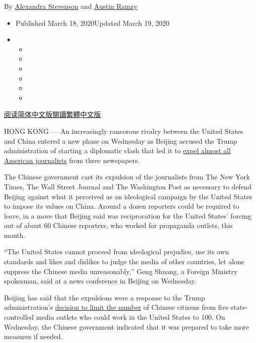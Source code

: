 By \href{https://www.nytimes.com/by/alexandra-stevenson}{Alexandra
Stevenson} and \href{https://www.nytimes.com/by/austin-ramzy}{Austin
Ramzy}

\begin{itemize}
\item
  Published March 18, 2020Updated March 19, 2020
\item
  \begin{itemize}
  \item
  \item
  \item
  \item
  \item
  \item
  \end{itemize}
\end{itemize}

\href{https://cn.nytimes.com/china/20200319/china-expels-journalists/}{阅读简体中文版}\href{https://cn.nytimes.com/china/20200319/china-expels-journalists/zh-han}{閱讀繁體中文版}

HONG KONG --- An increasingly rancorous rivalry between the United
States and China entered a new phase on Wednesday as Beijing accused the
Trump administration of starting a diplomatic clash that led it to
\href{https://www.nytimes.com/2020/03/17/business/media/china-expels-american-journalists.html}{expel
almost all American journalists} from three newspapers.

The Chinese government cast its expulsion of the journalists from The
New York Times, The Wall Street Journal and The Washington Post as
necessary to defend Beijing against what it perceived as an ideological
campaign by the United States to impose its values on China. Around a
dozen reporters could be required to leave, in a move that Beijing said
was reciprocation for the United States' forcing out of about 60 Chinese
reporters, who worked for propaganda outlets, this month.

``The United States cannot proceed from ideological prejudice, use its
own standards and likes and dislikes to judge the media of other
countries, let alone suppress the Chinese media unreasonably,'' Geng
Shuang, a Foreign Ministry spokesman, said at a news conference in
Beijing on Wednesday.

Beijing has said that the expulsions were a response to the Trump
administration's
\href{https://www.nytimes.com/2020/03/02/world/asia/china-journalists-diplomats-expulsion.html}{decision
to limit the number} of Chinese citizens from five state-controlled
media outlets who could work in the United States to 100. On Wednesday,
the Chinese government indicated that it was prepared to take more
measures if needed.

